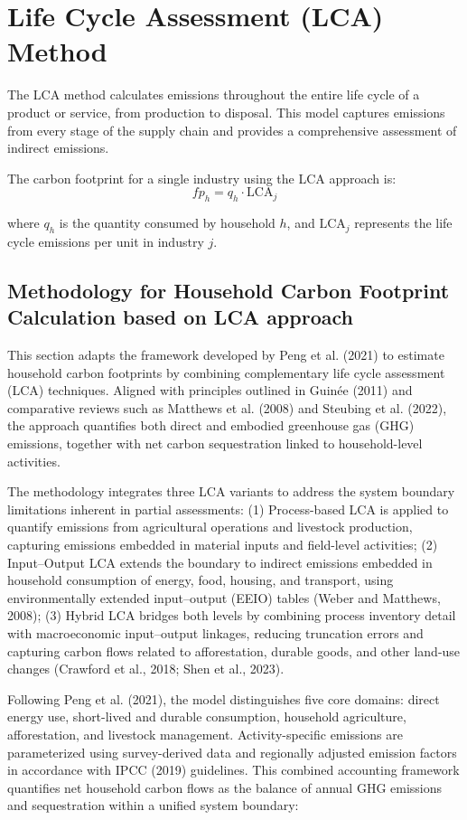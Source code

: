 \documentclass[12pt,a4paper]{article}%
\begin{document}
\section{Life Cycle Assessment (LCA) Method}
The LCA method calculates emissions throughout the entire life cycle of a product or service, from production to disposal. This model captures emissions from every stage of the supply chain and provides a comprehensive assessment of indirect emissions.

The carbon footprint for a single industry using the LCA approach is:
\begin{equation}
   fp_h = q_h \cdot \text{LCA}_j 
\end{equation}

where \(q_h\) is the quantity consumed by household \(h\), and \(\text{LCA}_j\) represents the life cycle emissions per unit in industry \(j\).


\subsection{Methodology for Household Carbon Footprint Calculation based on LCA approach}
This section adapts the framework developed by Peng et al. (2021) to estimate household carbon footprints by combining complementary life cycle assessment (LCA) techniques. Aligned with principles outlined in Guinée (2011) and comparative reviews such as Matthews et al. (2008) and Steubing et al. (2022), the approach quantifies both direct and embodied greenhouse gas (GHG) emissions, together with net carbon sequestration linked to household-level activities.

The methodology integrates three LCA variants to address the system boundary limitations inherent in partial assessments: (1) Process-based LCA is applied to quantify emissions from agricultural operations and livestock production, capturing emissions embedded in material inputs and field-level activities; (2) Input–Output LCA extends the boundary to indirect emissions embedded in household consumption of energy, food, housing, and transport, using environmentally extended input–output (EEIO) tables (Weber and Matthews, 2008); (3) Hybrid LCA bridges both levels by combining process inventory detail with macroeconomic input–output linkages, reducing truncation errors and capturing carbon flows related to afforestation, durable goods, and other land-use changes (Crawford et al., 2018; Shen et al., 2023).

Following Peng et al. (2021), the model distinguishes five core domains: direct energy use, short-lived and durable consumption, household agriculture, afforestation, and livestock management. Activity-specific emissions are parameterized using survey-derived data and regionally adjusted emission factors in accordance with IPCC (2019) guidelines. This combined accounting framework quantifies net household carbon flows as the balance of annual GHG emissions and sequestration within a unified system boundary:
\end{document}
